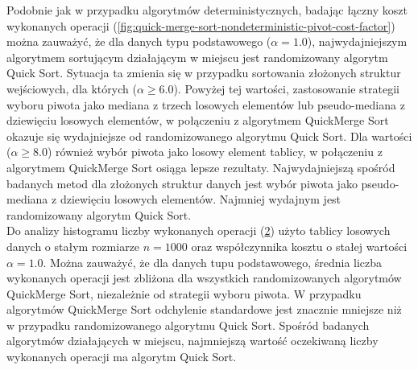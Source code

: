 Podobnie jak w przypadku algorytmów deterministycznych, badając łączny koszt wykonanych operacji (\ref{fig:quick-merge-sort-nondeterministic-pivot-cost-factor}) można zauważyć, że dla danych typu podstawowego ($\alpha = 1.0$), najwydajniejszym algorytmem sortującym działającym w miejscu jest randomizowany algorytm Quick Sort.
Sytuacja ta zmienia się w przypadku sortowania złożonych struktur wejściowych, dla których ($\alpha \ge 6.0$). Powyżej tej wartości, zastosowanie strategii wyboru piwota jako mediana z trzech losowych elementów lub pseudo-mediana z dziewięciu losowych elementów, w połączeniu z algorytmem QuickMerge Sort okazuje się wydajniejsze od randomizowanego algorytmu Quick Sort. Dla wartości ($\alpha \ge 8.0$) również wybór piwota jako losowy element tablicy, w połączeniu z algorytmem QuickMerge Sort osiąga lepsze rezultaty. Najwydajniejszą spośród badanych metod dla złożonych struktur danych jest wybór piwota jako pseudo-mediana z dziewięciu losowych elementów. Najmniej wydajnym jest randomizowany algorytm Quick Sort.\\

Do analizy histogramu liczby wykonanych operacji (\ref{fig:quick-merge-sort-nondeterministic-pivot-density}) użyto tablicy losowych danych o stałym rozmiarze $n = 1000$ oraz współczynnika kosztu o stałej wartości $\alpha = 1.0$. Można zauważyć, że dla danych tupu podstawowego, średnia liczba wykonanych operacji jest zbliżona dla wszystkich randomizowanych algorytmów QuickMerge Sort, niezależnie od strategii wyboru piwota. W przypadku algorytmów QuickMerge Sort odchylenie standardowe jest znacznie mniejsze niż w przypadku randomizowanego algorytmu Quick Sort. Spośród badanych algorytmów działających w miejscu, najmniejszą wartość oczekiwaną liczby wykonanych operacji ma algorytm Quick Sort.\\

\begin{figure}[]
	\centering
	
	\caption[]{}
	\label{fig:quick-merge-sort-nondeterministic-pivot-random}
\end{figure}

\begin{figure}[]
	\centering
	
	\caption[]{}
	\label{fig:quick-merge-sort-nondeterministic-pivot-density}
\end{figure}

